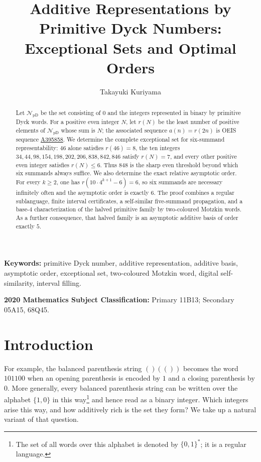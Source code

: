 \documentclass[12pt]{article}
\title{Additive Representations by Primitive Dyck Numbers:\\ Exceptional Sets and Optimal Orders}
\author{Takayuki Kuriyama}
\date{}
\theoremstyle{plain}
\theoremstyle{definition}
\theoremstyle{plain}
\newcommand{\NpD}{\mathcal{N}_{\mathrm{pD}}}
\newcommand{\seqnum}[1]{\href{https://oeis.org/#1}{\rm \underline{#1}}}
\begin{document}
\maketitle

\begin{abstract}
Let $\NpD$ be the set consisting of $0$ and the integers represented in
binary by primitive Dyck words.  For a positive even integer $N$, let $r(N)$
be the least number of positive elements of $\NpD$ whose sum is $N$; the
associated sequence $a(n)=r(2n)$ is OEIS sequence \seqnum{A395858}.  We
determine the complete exceptional set for six-summand representability:
$46$ alone satisfies $r(46)=8$, the ten integers
$34,44,98,154,198,202,206,838,842,846$ satisfy $r(N)=7$, and every other
positive even integer satisfies $r(N)\leq6$.  Thus $848$ is the sharp even
threshold beyond which six summands always suffice.  We also determine the
exact relative asymptotic order.  For every $k\geq2$, one has
$r(10\cdot4^{k+1}-6)=6$, so six summands are necessary infinitely often and the asymptotic order is
exactly $6$.  The proof combines a regular sublanguage, finite interval
certificates, a self-similar five-summand propagation, and a base-$4$
characterization of the halved primitive family by two-coloured Motzkin words.
As a further consequence, that halved family is an asymptotic additive basis
of order exactly $5$.
\end{abstract}

\noindent\textbf{Keywords:} primitive Dyck number, additive
representation, additive basis, asymptotic order, exceptional set,
two-coloured Motzkin word, digital self-similarity, interval filling.

\noindent\textbf{2020 Mathematics Subject Classification:} Primary 11B13;
Secondary 05A15, 68Q45.

\section{Introduction}\label{sec:introduction}

For example, the balanced parenthesis string $()(())$ becomes the word
$101100$ when an opening parenthesis is encoded by $1$ and a closing
parenthesis by $0$.  More generally, every balanced parenthesis string can
be written over the alphabet $\{1,0\}$ in this way\footnote{The set of all
words over this alphabet is denoted by $\{0,1\}^*$; it is a regular
language.} and hence read as a binary integer.  Which integers arise this
way, and how additively rich is the set they form?  We take up a natural
variant of that question.
\end{document}
